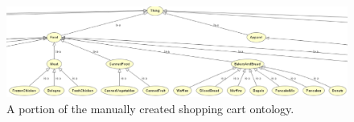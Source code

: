 %
%
\begin{figure}[tbh]
\begin{center}
\includegraphics[width=.9\textwidth]{fig/foodmart_onto2.eps}
\end{center}
\caption{\label{fig:foodmart_onto} A portion of the manually created shopping cart ontology.}
\end{figure}
%
